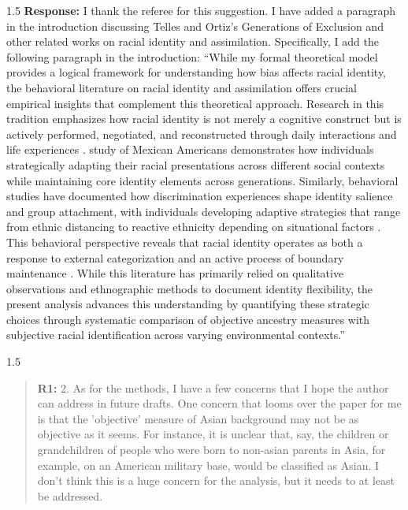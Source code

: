 \documentclass[12pt,english]{article}
\newcommand{\rrxspc}{1.5}
\begin{document}
\begin{refsection}
    \begin{spacing}{\rrxspc}
        \textbf{Response:} I thank the referee for this suggestion. I have added a paragraph in the introduction discussing Telles and Ortiz's Generations of Exclusion and other related works on racial identity and assimilation. Specifically, I add the following paragraph in the introduction: ``While my formal theoretical model provides a logical framework for understanding how bias affects racial identity, the behavioral literature on racial identity and assimilation offers crucial empirical insights that complement this theoretical approach. Research in this tradition emphasizes how racial identity is not merely a cognitive construct but is actively performed, negotiated, and reconstructed through daily interactions and life experiences \autocite{waters1990ethnic}. \textcite{telles2008generations} study of Mexican Americans demonstrates how individuals strategically adapting their racial presentations across different social contexts while maintaining core identity elements across generations. Similarly, behavioral studies have documented how discrimination experiences shape identity salience and group attachment, with individuals developing adaptive strategies that range from ethnic distancing to reactive ethnicity depending on situational factors \autocite{zhou1997segmented}. This behavioral perspective reveals that racial identity operates as both a response to external categorization and an active process of boundary maintenance \autocite{cornell2006ethnicity}. While this literature has primarily relied on qualitative observations and ethnographic methods to document identity flexibility, the present analysis advances this understanding by quantifying these strategic choices through systematic comparison of objective ancestry measures with subjective racial identification across varying environmental contexts.''
    \end{spacing}
    
    \begin{spacing}{\rrxspc}
    \begin{quotation}
        \textbf{R1: } 2. As for the methods, I have a few concerns that I hope the author can address in future drafts. One concern that looms over the paper for me is that the 'objective' measure of Asian background may not be as objective as it seems. For instance, it is unclear that, say, the children or grandchildren of people who were born to non-asian parents in Asia, for example, on an American military base, would be classified as Asian. I don't think this is a huge concern for the analysis, but it needs to at least be addressed.
        \end{quotation}
        \end{spacing}
        

\end{refsection}
\end{document}
